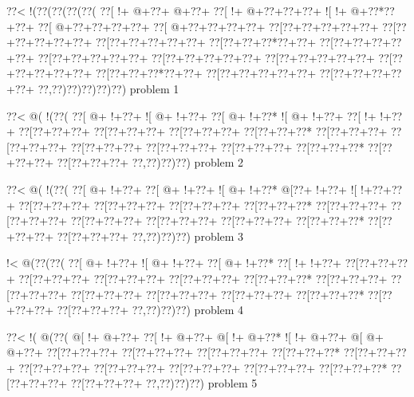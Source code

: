 \vbox{\vbox{\goo
\0??<\- !(\0??(\0??(\0??(\0??(
\0??[\- !+\- @+\0??+\- @+\0??+
\0??[\- !+\- @+\0??+\0??+\0??+
\- ![\- !+\- @+\0??*\0??+\0??+
\0??[\- @+\0??+\0??+\0??+\0??+
\0??[\- @+\0??+\0??+\0??+\0??+
\0??[\0??+\0??+\0??+\0??+\0??+
\0??[\0??+\0??+\0??+\0??+\0??+
\0??[\0??+\0??+\0??+\0??+\0??+
\0??[\0??+\0??+\0??*\0??+\0??+
\0??[\0??+\0??+\0??+\0??+\0??+
\0??[\0??+\0??+\0??+\0??+\0??+
\0??[\0??+\0??+\0??+\0??+\0??+
\0??[\0??+\0??+\0??+\0??+\0??+
\0??[\0??+\0??+\0??+\0??+\0??+
\0??[\0??+\0??+\0??*\0??+\0??+
\0??[\0??+\0??+\0??+\0??+\0??+
\0??[\0??+\0??+\0??+\0??+\0??+
\0??,\0??)\0??)\0??)\0??)\0??)
}
\hfil problem 1\hfil\break
}

\vbox{\vbox{\goo
\0??<\- @(\- !(\0??(
\0??[\- @+\- !+\0??+
\- ![\- @+\- !+\0??+
\0??[\- @+\- !+\0??*
\- ![\- @+\- !+\0??+
\0??[\- !+\- !+\0??+
\0??[\0??+\0??+\0??+
\0??[\0??+\0??+\0??+
\0??[\0??+\0??+\0??+
\0??[\0??+\0??+\0??*
\0??[\0??+\0??+\0??+
\0??[\0??+\0??+\0??+
\0??[\0??+\0??+\0??+
\0??[\0??+\0??+\0??+
\0??[\0??+\0??+\0??+
\0??[\0??+\0??+\0??*
\0??[\0??+\0??+\0??+
\0??[\0??+\0??+\0??+
\0??,\0??)\0??)\0??)
}
\hfil problem 2\hfil\break
}

\vbox{\vbox{\goo
\0??<\- @(\- !(\0??(
\0??[\- @+\- !+\0??+
\0??[\- @+\- !+\0??+
\- ![\- @+\- !+\0??*
\- @[\0??+\- !+\0??+
\- ![\- !+\0??+\0??+
\0??[\0??+\0??+\0??+
\0??[\0??+\0??+\0??+
\0??[\0??+\0??+\0??+
\0??[\0??+\0??+\0??*
\0??[\0??+\0??+\0??+
\0??[\0??+\0??+\0??+
\0??[\0??+\0??+\0??+
\0??[\0??+\0??+\0??+
\0??[\0??+\0??+\0??+
\0??[\0??+\0??+\0??*
\0??[\0??+\0??+\0??+
\0??[\0??+\0??+\0??+
\0??,\0??)\0??)\0??)
}
\hfil problem 3\hfil\break
}

\vbox{\vbox{\goo
\- !<\- @(\0??(\0??(
\0??[\- @+\- !+\0??+
\- ![\- @+\- !+\0??+
\0??[\- @+\- !+\0??*
\0??[\- !+\- !+\0??+
\0??[\0??+\0??+\0??+
\0??[\0??+\0??+\0??+
\0??[\0??+\0??+\0??+
\0??[\0??+\0??+\0??+
\0??[\0??+\0??+\0??*
\0??[\0??+\0??+\0??+
\0??[\0??+\0??+\0??+
\0??[\0??+\0??+\0??+
\0??[\0??+\0??+\0??+
\0??[\0??+\0??+\0??+
\0??[\0??+\0??+\0??*
\0??[\0??+\0??+\0??+
\0??[\0??+\0??+\0??+
\0??,\0??)\0??)\0??)
}
\hfil problem 4\hfil\break
}

\vbox{\vbox{\goo
\0??<\- !(\- @(\0??(
\- @[\- !+\- @+\0??+
\0??[\- !+\- @+\0??+
\- @[\- !+\- @+\0??*
\- ![\- !+\- @+\0??+
\- @[\- @+\- @+\0??+
\0??[\0??+\0??+\0??+
\0??[\0??+\0??+\0??+
\0??[\0??+\0??+\0??+
\0??[\0??+\0??+\0??*
\0??[\0??+\0??+\0??+
\0??[\0??+\0??+\0??+
\0??[\0??+\0??+\0??+
\0??[\0??+\0??+\0??+
\0??[\0??+\0??+\0??+
\0??[\0??+\0??+\0??*
\0??[\0??+\0??+\0??+
\0??[\0??+\0??+\0??+
\0??,\0??)\0??)\0??)
}
\hfil problem 5\hfil\break
}


